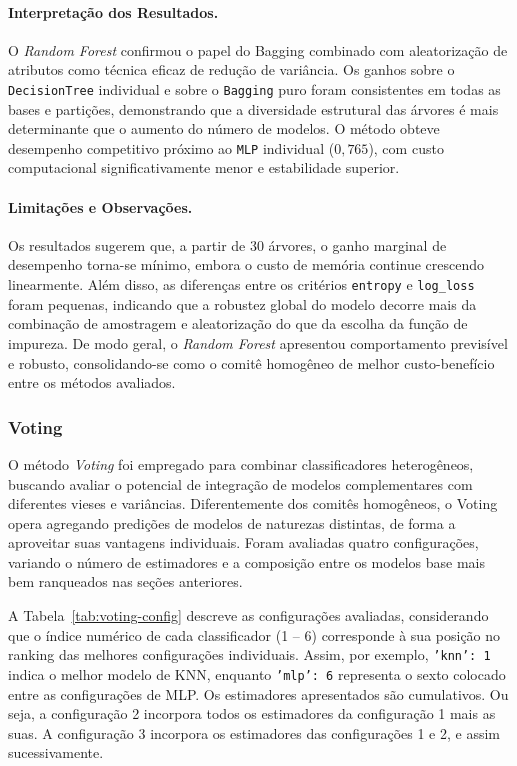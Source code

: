 \documentclass[12pt]{article}
\begin{document}
\paragraph{Interpretação dos Resultados.}
O \textit{Random Forest} confirmou o papel do Bagging combinado com aleatorização de atributos como técnica eficaz de redução de variância.  
Os ganhos sobre o \texttt{DecisionTree} individual e sobre o \texttt{Bagging} puro foram consistentes em todas as bases e partições, demonstrando que a diversidade estrutural das árvores é mais determinante que o aumento do número de modelos.  
O método obteve desempenho competitivo próximo ao \texttt{MLP} individual (\(0{,}765\)), com custo computacional significativamente menor e estabilidade superior.

\paragraph{Limitações e Observações.}
Os resultados sugerem que, a partir de 30 árvores, o ganho marginal de desempenho torna-se mínimo, embora o custo de memória continue crescendo linearmente.  
Além disso, as diferenças entre os critérios \texttt{entropy} e \texttt{log\_loss} foram pequenas, indicando que a robustez global do modelo decorre mais da combinação de amostragem e aleatorização do que da escolha da função de impureza.  
De modo geral, o \textit{Random Forest} apresentou comportamento previsível e robusto, consolidando-se como o comitê homogêneo de melhor custo-benefício entre os métodos avaliados.



\subsubsection{Voting}

O método \textit{Voting} foi empregado para combinar classificadores heterogêneos, buscando avaliar o potencial de integração de modelos complementares com diferentes vieses e variâncias.  
Diferentemente dos comitês homogêneos, o Voting opera agregando predições de modelos de naturezas distintas, de forma a aproveitar suas vantagens individuais.  
Foram avaliadas quatro configurações, variando o número de estimadores e a composição entre os modelos base mais bem ranqueados nas seções anteriores.

A Tabela~\ref{tab:voting-config} descreve as configurações avaliadas, considerando que o índice numérico de cada classificador (1 – 6) corresponde à sua posição no ranking das melhores configurações individuais.  
Assim, por exemplo, \texttt{'knn': 1} indica o melhor modelo de KNN, enquanto \texttt{'mlp': 6} representa o sexto colocado entre as configurações de MLP. Os estimadores apresentados são cumulativos. Ou seja, a configuração 2 incorpora todos os estimadores da configuração 1 mais as suas. A configuração 3 incorpora os estimadores das configurações 1 e 2, e assim sucessivamente.
\end{document}
